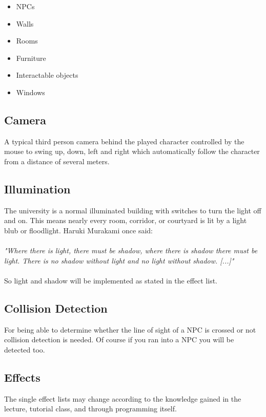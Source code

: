 \documentclass[12pt]{article}
\begin{document}
\begin{itemize}
	\item  NPCs
	\item Walls
	\item Rooms
	\item Furniture
	\item Interactable objects
	\item Windows
\end{itemize}


\subsection*{Camera}
A typical third person camera behind the played character controlled by the mouse to swing up, down, left and right which automatically follow the character from a distance of several meters.
\subsection*{Illumination}
The university is a normal illuminated building with switches to turn the light off and on. This means nearly every room, corridor, or courtyard is lit by a light blub or floodlight. Haruki Murakami once said:\\\\
\textit{"Where there is light, there must be shadow, where there is shadow there must be light. There is no shadow without light and no light without shadow. [...]"}\\\\
So light and shadow will be implemented as stated in the effect list.

\subsection*{Collision Detection}

For being able to determine whether the line of sight of a NPC is crossed or not collision detection is needed. Of course if you ran into a NPC you will be detected too.

\subsection*{Effects}

The single effect lists may change according to the knowledge gained in the lecture, tutorial class, and through programming itself.
\end{document}
